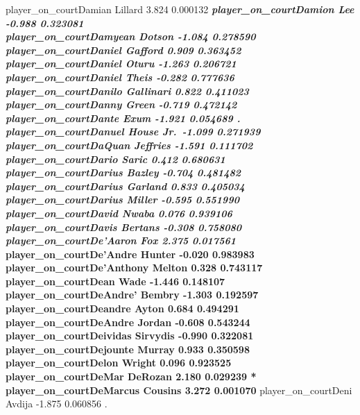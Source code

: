 \documentclass[
  landscape]{article}
\begin{document}
player\_on\_courtDamian Lillard 3.824 0.000132 \textbf{\emph{
player\_on\_courtDamion Lee -0.988 0.323081\\
player\_on\_courtDamyean Dotson -1.084 0.278590\\
player\_on\_courtDaniel Gafford 0.909 0.363452\\
player\_on\_courtDaniel Oturu -1.263 0.206721\\
player\_on\_courtDaniel Theis -0.282 0.777636\\
player\_on\_courtDanilo Gallinari 0.822 0.411023\\
player\_on\_courtDanny Green -0.719 0.472142\\
player\_on\_courtDante Exum -1.921 0.054689 .\\
player\_on\_courtDanuel House Jr.~-1.099 0.271939\\
player\_on\_courtDaQuan Jeffries -1.591 0.111702\\
player\_on\_courtDario Saric 0.412 0.680631\\
player\_on\_courtDarius Bazley -0.704 0.481482\\
player\_on\_courtDarius Garland 0.833 0.405034\\
player\_on\_courtDarius Miller -0.595 0.551990\\
player\_on\_courtDavid Nwaba 0.076 0.939106\\
player\_on\_courtDavis Bertans -0.308 0.758080\\
player\_on\_courtDe'Aaron Fox 2.375 0.017561 }\\
player\_on\_courtDe'Andre Hunter -0.020 0.983983\\
player\_on\_courtDe'Anthony Melton 0.328 0.743117\\
player\_on\_courtDean Wade -1.446 0.148107\\
player\_on\_courtDeAndre' Bembry -1.303 0.192597\\
player\_on\_courtDeandre Ayton 0.684 0.494291\\
player\_on\_courtDeAndre Jordan -0.608 0.543244\\
player\_on\_courtDeividas Sirvydis -0.990 0.322081\\
player\_on\_courtDejounte Murray 0.933 0.350598\\
player\_on\_courtDelon Wright 0.096 0.923525\\
player\_on\_courtDeMar DeRozan 2.180 0.029239 *\\
player\_on\_courtDeMarcus Cousins 3.272 0.001070 } player\_on\_courtDeni
Avdija -1.875 0.060856 .\\
\end{document}
